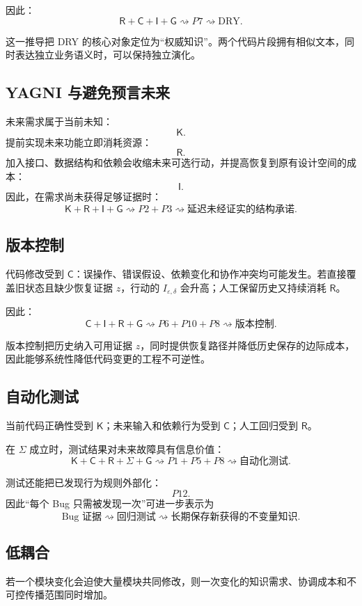 \documentclass[11pt,a4paper]{ctexart}
\numberwithin{equation}{section}
\theoremstyle{definition}
\theoremstyle{plain}
\newcommand{\Know}{\mathsf{K}}
\newcommand{\Res}{\mathsf{R}}
\newcommand{\Ctrl}{\mathsf{C}}
\newcommand{\Info}{\mathsf{I}}
\newcommand{\Goal}{\mathsf{G}}
\newcommand{\Learn}{\Sigma}
\begin{document}
因此：
\[
\Res+\Ctrl+\Info+\Goal
\rightsquigarrow
P7
\rightsquigarrow
\text{DRY}.
\]

这一推导把 DRY 的核心对象定位为“权威知识”。两个代码片段拥有相似文本，同时表达独立业务语义时，可以保持独立演化。

\subsection{YAGNI 与避免预言未来}

未来需求属于当前未知：
\[
\Know.
\]
提前实现未来功能立即消耗资源：
\[
\Res.
\]
加入接口、数据结构和依赖会收缩未来可选行动，并提高恢复到原有设计空间的成本：
\[
\Info.
\]
因此，在需求尚未获得足够证据时：
\[
\Know+\Res+\Info+\Goal
\rightsquigarrow
P2+P3
\rightsquigarrow
\text{延迟未经证实的结构承诺}.
\]

\subsection{版本控制}

代码修改受到 $\Ctrl$：误操作、错误假设、依赖变化和协作冲突均可能发生。若直接覆盖旧状态且缺少恢复证据 $z$，行动的 $I_{\varepsilon,\delta}$ 会升高；人工保留历史又持续消耗 $\Res$。

因此：
\[
\Ctrl+\Info+\Res+\Goal
\rightsquigarrow
P6+P10+P8
\rightsquigarrow
\text{版本控制}.
\]

版本控制把历史纳入可用证据 $z$，同时提供恢复路径并降低历史保存的边际成本，因此能够系统性降低代码变更的工程不可逆性。

\subsection{自动化测试}

当前代码正确性受到 $\Know$；未来输入和依赖行为受到 $\Ctrl$；人工回归受到 $\Res$。

在 $\Learn$ 成立时，测试结果对未来故障具有信息价值：
\[
\Know+\Ctrl+\Res+\Learn+\Goal
\rightsquigarrow
P1+P5+P8
\rightsquigarrow
\text{自动化测试}.
\]

测试还能把已发现行为规则外部化：
\[
P12.
\]
因此“每个 Bug 只需被发现一次”可进一步表示为
\[
\text{Bug 证据}
\rightsquigarrow
\text{回归测试}
\rightsquigarrow
\text{长期保存新获得的不变量知识}.
\]

\subsection{低耦合}

若一个模块变化会迫使大量模块共同修改，则一次变化的知识需求、协调成本和不可控传播范围同时增加。
\end{document}
